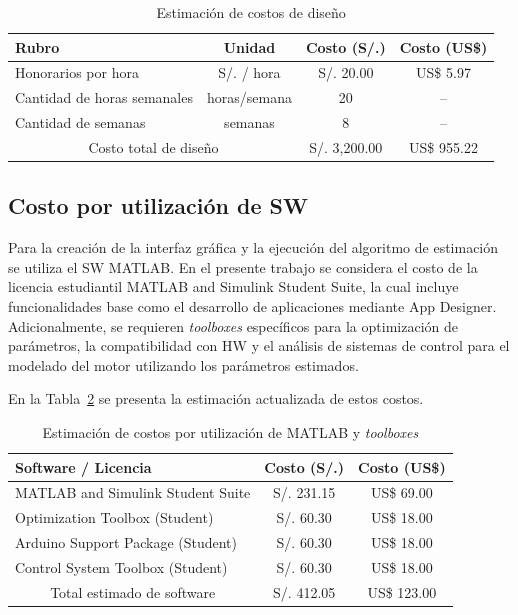 \begin{table}[H]
\centering
\caption{Estimación de costos de diseño}
\label{tab:costo_diseno_ingenieril}

\vspace{0.5em}

\begin{tabular}{|p{5cm}|c||c|c|}
\hline
Rubro & Unidad & Costo (S/.) & Costo (US\$) \\
\hline
Honorarios por hora & S/. / hora & S/. 20.00 & US\$ 5.97 \\
\hline
Cantidad de horas semanales & horas/semana & 20 & -- \\
\hline
Cantidad de semanas & semanas & 8 & -- \\
\hline
\multicolumn{2}{|c||}{Costo total de diseño} 
& S/. 3,200.00 
& US\$ 955.22 \\
\hline
\end{tabular}
\end{table}

\subsection{Costo por utilización de \ac{SW}}

\noindent
Para la creación de la interfaz gráfica y la ejecución del algoritmo de estimación se utiliza el \ac{SW} MATLAB. En el presente trabajo se considera el costo de la licencia estudiantil MATLAB and Simulink Student Suite, la cual incluye funcionalidades base como el desarrollo de aplicaciones mediante App Designer. Adicionalmente, se requieren \textit{toolboxes} específicos para la optimización de parámetros, la compatibilidad con \ac{HW} y el análisis de sistemas de control para el modelado del motor utilizando los parámetros estimados. 

\noindent
En la Tabla~\ref{tab:costos_software_matlab} se presenta la estimación actualizada de estos costos.

\begin{table}[H]
\centering
\caption{Estimación de costos por utilización de MATLAB y \textit{toolboxes}}
\label{tab:costos_software_matlab}

\vspace{0.5em}

\begin{tabular}{|p{7cm}||c|c|}
\hline
Software / Licencia & Costo (S/.) & Costo (US\$) \\
\hline
MATLAB and Simulink Student Suite 
& S/. 231.15 
& US\$ 69.00 \\
\hline
Optimization Toolbox (Student) 
& S/. 60.30 
& US\$ 18.00 \\
\hline
Arduino Support Package (Student) 
& S/. 60.30 
& US\$ 18.00 \\
\hline
Control System Toolbox (Student) 
& S/. 60.30 
& US\$ 18.00 \\
\hline
\multicolumn{1}{|c||}{Total estimado de software} 
& S/. 412.05 
& US\$ 123.00 \\
\hline
\end{tabular}
\end{table}

